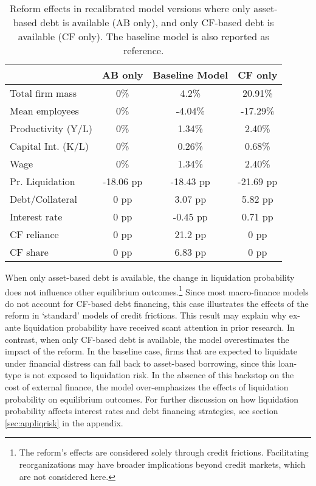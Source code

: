 \documentclass[12pt]{article}
\begin{document}
\begin{table}[H]
    \centering
    \begin{tabular}{lccc}
    & \textbf{AB only} & \textbf{Baseline Model} & \textbf{CF only} \\    
    \toprule
    Total firm mass & 0\% & 4.2\%  & 20.91\%  \\  
    Mean employees & 0\% & -4.04\%  & -17.29\%   \\  
    Productivity (Y/L) & 0\% & 1.34\%  & 2.40\%  \\  
    Capital Int. (K/L) & 0\% & 0.26\%  & 0.68\%  \\  
    Wage & 0\% & 1.34\%  & 2.40\%  \vspace{2mm}  \\  
    Pr. Liquidation & -18.06 pp & -18.43 pp  & -21.69 pp \\  
    Debt/Collateral & 0 pp & 3.07 pp  & 5.82 pp  \\  
    Interest rate & 0 pp & -0.45 pp  & 0.71 pp  \\  
    CF reliance & 0 pp & 21.2 pp  & 0 pp  \\    
    CF share & 0 pp & 6.83 pp  & 0 pp  \\  
    \bottomrule
    \end{tabular}
    \caption{Reform effects in recalibrated model versions where only asset-based debt is available (AB only), and only CF-based debt is available (CF only). The baseline model is also reported as reference.}
    \label{tab:percentage_changes}
\end{table}

\noindent When only asset-based debt is available, the change in liquidation probability does not influence other equilibrium outcomes.\footnote{The reform’s effects are considered solely through credit frictions. Facilitating reorganizations may have broader implications beyond credit markets, which are not considered here.} Since most macro-finance models do not account for CF-based debt financing, this case illustrates the effects of the reform in `standard' models of credit frictions. This result may explain why ex-ante liquidation probability have received scant attention in prior research. In contrast, when only CF-based debt is available, the model overestimates the impact of the reform. In the baseline case, firms that are expected to liquidate under financial distress can fall back to asset-based borrowing, since this loan-type is not exposed to liquidation risk. In the absence of this backstop on the cost of external finance, the model over-emphasizes the effects of liquidation probability on equilibrium outcomes. For further discussion on how liquidation probability affects interest rates and debt financing strategies, see section \ref{sec:appliqrisk} in the appendix. 
\end{document}
